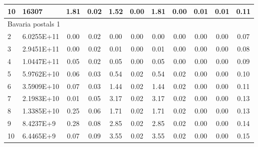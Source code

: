 {\begin{longtable}{@{}llccccccccc@{}}
\multicolumn{1}{l|}{10} & \multicolumn{1}{l|}{16307}      & 1.81 & \multicolumn{1}{c|}{0.02} & 1.52 & \multicolumn{1}{c|}{0.00} & 1.81 & \multicolumn{1}{c|}{0.00} & 0.01      & 0.01      & 0.11 \\ \hline
\multicolumn{11}{l}{Bavaria postals 1}                                                                                                                                                            \\ \hline
\multicolumn{1}{l|}{2}  & \multicolumn{1}{l|}{6.0255E+11} & 0.00 & \multicolumn{1}{c|}{0.02} & 0.00 & \multicolumn{1}{c|}{0.00} & 0.00 & \multicolumn{1}{c|}{0.00} & 0.00      & 0.00      & 0.07 \\
\multicolumn{1}{l|}{3}  & \multicolumn{1}{l|}{2.9451E+11} & 0.00 & \multicolumn{1}{c|}{0.02} & 0.01 & \multicolumn{1}{c|}{0.00} & 0.01 & \multicolumn{1}{c|}{0.00} & 0.00      & 0.00      & 0.08 \\
\multicolumn{1}{l|}{4}  & \multicolumn{1}{l|}{1.0447E+11} & 0.05 & \multicolumn{1}{c|}{0.02} & 0.05 & \multicolumn{1}{c|}{0.00} & 0.05 & \multicolumn{1}{c|}{0.00} & 0.00      & 0.00      & 0.09 \\
\multicolumn{1}{l|}{5}  & \multicolumn{1}{l|}{5.9762E+10} & 0.06 & \multicolumn{1}{c|}{0.03} & 0.54 & \multicolumn{1}{c|}{0.02} & 0.54 & \multicolumn{1}{c|}{0.02} & 0.00      & 0.00      & 0.10 \\
\multicolumn{1}{l|}{6}  & \multicolumn{1}{l|}{3.5909E+10} & 0.07 & \multicolumn{1}{c|}{0.03} & 1.44 & \multicolumn{1}{c|}{0.02} & 1.44 & \multicolumn{1}{c|}{0.02} & 0.00      & 0.00      & 0.11 \\
\multicolumn{1}{l|}{7}  & \multicolumn{1}{l|}{2.1983E+10} & 0.01 & \multicolumn{1}{c|}{0.05} & 3.17 & \multicolumn{1}{c|}{0.02} & 3.17 & \multicolumn{1}{c|}{0.02} & 0.00      & 0.00      & 0.13 \\
\multicolumn{1}{l|}{8}  & \multicolumn{1}{l|}{1.3385E+10} & 0.25 & \multicolumn{1}{c|}{0.06} & 1.71 & \multicolumn{1}{c|}{0.02} & 1.71 & \multicolumn{1}{c|}{0.02} & 0.00      & 0.00      & 0.13 \\
\multicolumn{1}{l|}{9}  & \multicolumn{1}{l|}{8.4237E+9}  & 0.28 & \multicolumn{1}{c|}{0.08} & 2.85 & \multicolumn{1}{c|}{0.02} & 2.85 & \multicolumn{1}{c|}{0.02} & 0.00      & 0.00      & 0.14 \\
\multicolumn{1}{l|}{10} & \multicolumn{1}{l|}{6.4465E+9}  & 0.07 & \multicolumn{1}{c|}{0.09} & 3.55 & \multicolumn{1}{c|}{0.02} & 3.55 & \multicolumn{1}{c|}{0.02} & 0.00      & 0.00      & 0.15 \\ \hline

\end{longtable}}
